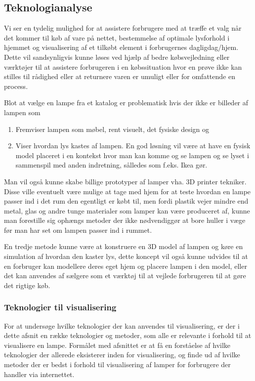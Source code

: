 \subsection{Teknologianalyse}
\label{sec:teknologianalyse}
Vi ser en tydelig mulighed for at assistere forbrugere med at træffe et valg når det kommer til køb af vare på nettet, bestemmelse af optimale lysforhold i hjemmet og visualisering af et tilkøbt element i forbrugernes dagligdag/hjem. Dette vil sandsynligvis kunne løses ved hjælp af bedre købsvejledning eller værktøjer til at assistere forbrugeren i en købssituation hvor en prøve ikke kan stilles til rådighed eller at returnere varen er umuligt eller for omfattende en process.

Blot at vælge en lampe fra et katalog er problematisk hvis der ikke er billeder af lampen som
\begin{enumerate}
    \item Fremviser lampen som møbel, rent visuelt, det fysiske design og 
    \item Viser hvordan lys kastes af lampen. En god løsning vil være at have en fysisk model placeret i en kontekst hvor man kan komme og se lampen og se lyset i sammenspil med anden indretning, sålledes som f.eks. Ikea gør.
\end{enumerate}

Man vil også kunne skabe billige prototyper af lamper vha. 3D printer tekniker. Disse ville eventuelt være mulige at tage med hjem for at teste hvordan en lampe passer ind i det rum den egentligt er købt til, men fordi plastik vejer mindre end metal, glas og andre tunge materialer som lamper kan være produceret af, kunne man forestille sig ophængs metoder der ikke nødvendiggør at bore huller i væge før man har set om lampen passer ind i rummet.

En tredje metode kunne være at konstruere en 3D model af lampen og køre en simulation af hvordan den kaster lys, dette koncept vil også kunne udvides til at en forbruger kan modellere deres eget hjem og placere lampen i den model, eller det kan anvendes af sælgere som et værktøj til at vejlede forbrugeren til at gøre det rigtige køb.


\subsubsection{Teknologier til visualisering}
For at undersøge hvilke teknologier der kan anvendes til visualisering, er der i dette afsnit en række teknologier og metoder, som alle er relevante i forhold til at visualisere en lampe. Formålet med afsnittet er at få en forståelse af hvilke teknologier der allerede eksisterer inden for visualisering, og finde ud af hvilke metoder der er bedst i forhold til visualisering af lamper for forbrugere der handler via internettet.

